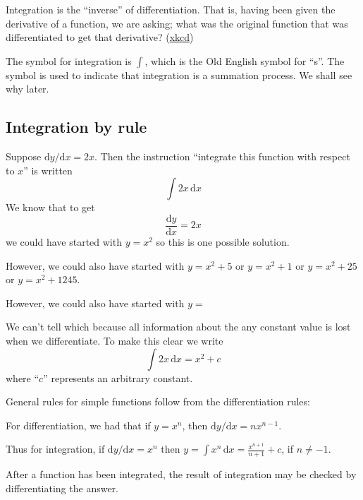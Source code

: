 \documentclass[
  english,
  11pt,
  oneside]{book}
\newcommand{\slide}{}
\theoremstyle{definition}
\theoremstyle{definition}
\theoremstyle{definition}
\theoremstyle{definition}
\theoremstyle{remark}
\begin{document}
Integration is the ``inverse'' of differentiation. That is, having been given the derivative of a function, we are asking; what was the original function that was differentiated to get that derivative? (\href{https://xkcd.com/2117/}{xkcd})

The symbol for integration is \(\displaystyle\int\), which is the Old English symbol for ``s''. The symbol is used to indicate that integration is a summation process. We shall see why later.

\slide

\subsection{Integration by rule}\label{integration-by-rule}

Suppose \(\mathrm{d}y/\mathrm{d} x = 2x\). Then the instruction ``integrate this function with respect to \(x\)'' is written
\[\int 2x \,\mathrm{d}x\]
We know that to get
\[\frac{\mathrm{d}y}{\mathrm{d}x} = 2x\]
we could have started with \(y = x^2\) so this is one possible solution.

\begin{notslides}

However, we could also have started with \(y = x^2 + 5\) or \(y = x^2 + 1\) or \(y = x^2 + 25\) or \(y = x^2 + 1245\).

\end{notslides}

\begin{slidesonly}

However, we could also have started with \(y =\)
\slide

\end{slidesonly}

We can't tell which because all information about the any constant value is lost when we differentiate. To make this clear we write
\[\int 2x \,\mathrm{d}x = x^2 + c\]
where ``\(c\)'' represents an arbitrary constant.

\slide

General rules for simple functions follow from the differentiation rules:

For differentiation, we had that if \(y = x^n\), then \(\mathrm{d}y/\mathrm{d} x= nx^{n-1}\).

Thus for integration, if \(\mathrm{d}y/\mathrm{d}x = x^n\) then \(y=\displaystyle\int x^n \,\mathrm{d}x = \frac{x^{n+1}}{n+1} + c\), if \(n \ne -1\).

After a function has been integrated, the result of integration may be checked by differentiating the answer.
\end{document}
